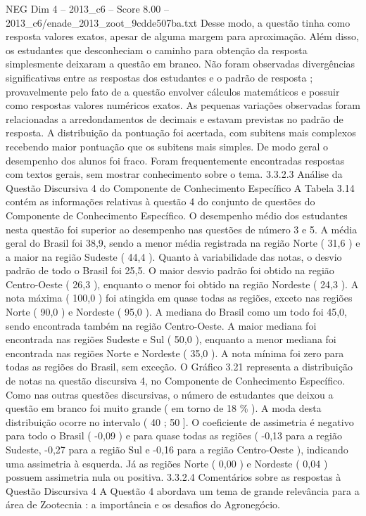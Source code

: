 \begin{textsample}{NEG Dim 4 – 2013\_c6 – Score 8.00 – 2013\_c6/enade\_2013\_zoot\_9cdde507ba.txt}
Desse modo, a questão tinha como resposta valores exatos, apesar de alguma margem para aproximação.
Além disso, os estudantes que desconheciam o caminho para obtenção da resposta simplesmente deixaram a questão em branco.
Não foram observadas divergências significativas entre as respostas dos estudantes e o padrão de resposta ; provavelmente pelo fato de a questão envolver cálculos matemáticos e possuir como respostas valores numéricos exatos.
As pequenas variações observadas foram relacionadas a arredondamentos de decimais e estavam previstas no padrão de resposta.
A distribuição da pontuação foi acertada, com subitens mais complexos recebendo maior pontuação que os subitens mais simples.
De modo geral o desempenho dos alunos foi fraco.
Foram frequentemente encontradas respostas com textos gerais, sem mostrar conhecimento sobre o tema. 3.3.2.3 Análise da Questão Discursiva 4 do Componente de Conhecimento Específico A Tabela 3.14 contém as informações relativas à questão 4 do conjunto de questões do Componente de Conhecimento Específico.
O desempenho médio dos estudantes nesta questão foi superior ao desempenho nas questões de número 3 e 5.
A média geral do Brasil foi 38,9, sendo a menor média registrada na região Norte ( 31,6 ) e a maior na região Sudeste ( 44,4 ).
Quanto à variabilidade das notas, o desvio padrão de todo o Brasil foi 25,5.
O maior desvio padrão foi obtido na região Centro-Oeste ( 26,3 ), enquanto o menor foi obtido na região Nordeste ( 24,3 ).
A nota máxima ( 100,0 ) foi atingida em quase todas as regiões, exceto nas regiões Norte ( 90,0 ) e Nordeste ( 95,0 ).
A mediana do Brasil como um todo foi 45,0, sendo encontrada também na região Centro-Oeste.
A maior mediana foi encontrada nas regiões Sudeste e Sul ( 50,0 ), enquanto a menor mediana foi encontrada nas regiões Norte e Nordeste ( 35,0 ).
A nota mínima foi zero para todas as regiões do Brasil, sem exceção.
O Gráfico 3.21 representa a distribuição de notas na questão discursiva 4, no Componente de Conhecimento Específico.
Como nas outras questões discursivas, o número de estudantes que deixou a questão em branco foi muito grande ( em torno de 18 \% ).
A moda desta distribuição ocorre no intervalo ( 40 ; 50 ].
O coeficiente de assimetria é negativo para todo o Brasil ( -0,09 ) e para quase todas as regiões ( -0,13 para a região Sudeste, -0,27 para a região Sul e -0,16 para a região Centro-Oeste ), indicando uma assimetria à esquerda.
Já as regiões Norte ( 0,00 ) e Nordeste ( 0,04 ) possuem assimetria nula ou positiva. 3.3.2.4 Comentários sobre as respostas à Questão Discursiva 4 A Questão 4 abordava um tema de grande relevância para a área de Zootecnia : a importância e os desafios do Agronegócio.

\end{textsample}
